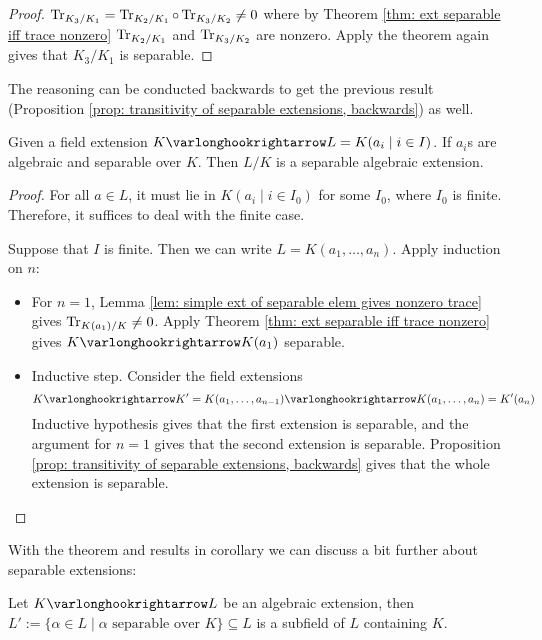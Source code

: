 \begin{proof}
    $\operatorname{Tr}_{K_3/K_1} = \operatorname{Tr}_{K_2/K_1} \circ \operatorname{Tr}_{K_3/K_2} \neq 0$ where by Theorem \ref{thm: ext separable iff trace nonzero} $\operatorname{Tr}_{K_2/K_1}$ and $\operatorname{Tr}_{K_3/K_2}$ are nonzero. Apply the theorem again gives that $K_3/K_1$ is separable. 
\end{proof}

\begin{remark}
    The reasoning can be conducted backwards to get the previous result (Proposition \ref{prop: transitivity of separable extensions, backwards}) as well. 
\end{remark}

\begin{corollary}\label{cor: extension generated by separable elements is separable}
    Given a field extension $K \ext L = K(a_i \mid i \in I)$. If $a_i$s are algebraic and separable over $K$. Then $L/K$ is a separable algebraic extension.
\end{corollary}

\begin{proof}
    For all $a \in L$, it must lie in $K(a_i \mid i \in I_0)$ for some $I_0$, where $I_0$ is finite. Therefore, it suffices to deal with the finite case.

    Suppose that $I$ is finite. Then we can write $L = K(a_1, \dots, a_n)$. Apply induction on $n$: 
    \begin{itemize}
        \item For $n = 1$, Lemma \ref{lem: simple ext of separable elem gives nonzero trace} gives $\operatorname{Tr}_{K(a_1)/K} \neq 0$. Apply Theorem \ref{thm: ext separable iff trace nonzero} gives $K \ext K(a_1)$ separable. 
        \item Inductive step. Consider the field extensions
        \[
            K \ext K' = K(a_1, \dots, a_{n-1}) \ext K(a_1, \dots, a_{n}) = K'(a_n)
        \]
        Inductive hypothesis gives that the first extension is separable, and the argument for $n = 1$ gives that the second extension is separable. Proposition \ref{prop: transitivity of separable extensions, backwards} gives that the whole extension is separable. 
    \end{itemize}
\end{proof}

\textstart
With the theorem and results in corollary we can discuss a bit further about separable extensions:

\begin{proposition}
    Let $K \ext L$ be an algebraic extension, then $L' := \{ \alpha \in L \mid \alpha \text{ separable over $K$}\} \subseteq L$ is a subfield of $L$ containing $K$.
\end{proposition}

